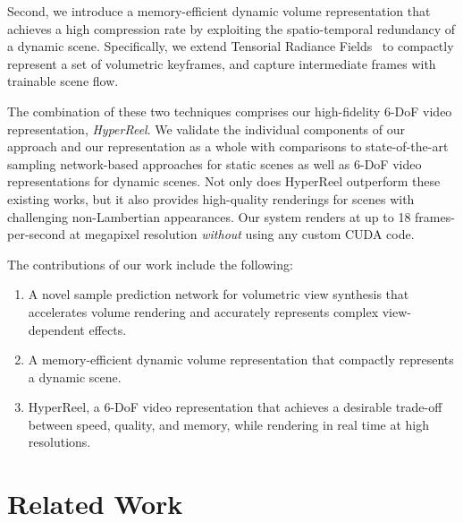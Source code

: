 \documentclass[10pt,twocolumn,letterpaper]{article}
\begin{document}
{Second, we introduce a memory-efficient dynamic volume representation that achieves a high compression rate by exploiting the spatio-temporal redundancy of a dynamic scene.
Specifically, we extend Tensorial Radiance Fields~\cite{ChenXGYS2022} to compactly represent a set of volumetric keyframes, and capture intermediate frames with trainable scene flow. 

The combination of these two techniques comprises our high-fidelity 6-DoF video representation, \emph{HyperReel}.
We validate the individual components of our approach and our representation as a whole with comparisons to state-of-the-art sampling network-based approaches for static scenes as well as 6-DoF video representations for dynamic scenes.
Not only does HyperReel outperform these existing works, but it also provides high-quality renderings for scenes with challenging non-Lambertian appearances.
Our system renders at up to 18 frames-per-second at megapixel resolution \emph{without} using any custom CUDA code.

The contributions of our work include the following:
\begin{enumerate}\itemsep0em
    \item
    A novel sample prediction network for volumetric view synthesis that accelerates volume rendering and accurately represents complex view-dependent effects.

    \item
    A memory-efficient dynamic volume representation that compactly represents a dynamic scene.
    
    \item
    HyperReel, a 6-DoF video representation that achieves a desirable trade-off between speed, quality, and memory, while rendering in real time at high resolutions.
\end{enumerate}
 \section{Related Work}
\label{sec:relatedwork}

}
\end{document}
